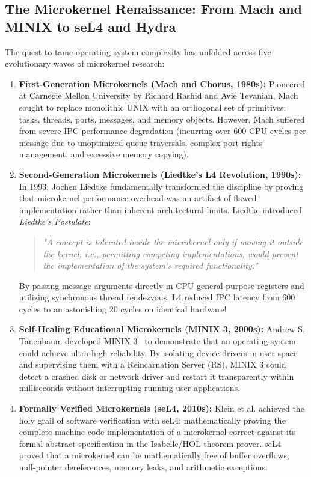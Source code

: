 \subsection{The Microkernel Renaissance: From Mach and MINIX to seL4 and Hydra}
The quest to tame operating system complexity has unfolded across five evolutionary waves of microkernel research:
\begin{enumerate}
    \item \textbf{First-Generation Microkernels (Mach and Chorus, 1980s):} Pioneered at Carnegie Mellon University by Richard Rashid and Avie Tevanian, Mach~\cite{accolta1986mach} sought to replace monolithic UNIX with an orthogonal set of primitives: tasks, threads, ports, messages, and memory objects. However, Mach suffered from severe IPC performance degradation (incurring over 600 CPU cycles per message due to unoptimized queue traversals, complex port rights management, and excessive memory copying).
    \item \textbf{Second-Generation Microkernels (Liedtke's L4 Revolution, 1990s):} In 1993, Jochen Liedtke fundamentally transformed the discipline by proving that microkernel performance overhead was an artifact of flawed implementation rather than inherent architectural limits. Liedtke introduced \textit{Liedtke's Postulate}:
    \begin{quote}
    \textit{"A concept is tolerated inside the microkernel only if moving it outside the kernel, i.e., permitting competing implementations, would prevent the implementation of the system's required functionality."}
    \end{quote}
    By passing message arguments directly in CPU general-purpose registers and utilizing synchronous thread rendezvous, L4 reduced IPC latency from 600 cycles to an astonishing 20 cycles on identical hardware!
    \item \textbf{Self-Healing Educational Microkernels (MINIX 3, 2000s):} Andrew S. Tanenbaum developed MINIX 3~\cite{tanenbaum1987operating} to demonstrate that an operating system could achieve ultra-high reliability. By isolating device drivers in user space and supervising them with a Reincarnation Server (RS), MINIX 3 could detect a crashed disk or network driver and restart it transparently within milliseconds without interrupting running user applications.
    \item \textbf{Formally Verified Microkernels (seL4, 2010s):} Klein et al. achieved the holy grail of software verification with seL4: mathematically proving the complete machine-code implementation of a microkernel correct against its formal abstract specification in the Isabelle/HOL theorem prover. seL4 proved that a microkernel can be mathematically free of buffer overflows, null-pointer dereferences, memory leaks, and arithmetic exceptions.

\end{enumerate}
